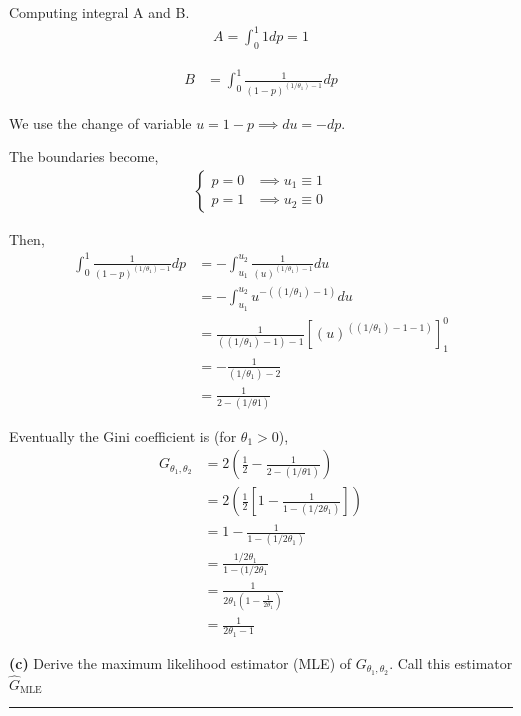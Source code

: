 Computing integral A and B.
\begin{align*}
  A = \int_0^1 1 dp = 1
\end{align*}

\begin{align*}
  B 
    &= \int_0^1 \frac{1}{(1-p)^{(1/\theta_1) - 1}} dp
\end{align*}

We use the change of variable $u = 1 - p \implies du = -dp$. 

The boundaries become, 
\begin{align*}
  \begin{cases}
    p = 0 &\implies u_1 \equiv 1 \\
    p = 1 &\implies u_2 \equiv 0
  \end{cases}
\end{align*}

Then, 
\begin{align*}
  \int_0^1 \frac{1}{(1-p)^{(1/\theta_1) - 1}} dp
    &= - \int_{u_1}^{u_2} \frac{1}{(u)^{(1/\theta_1) - 1}} du \\
    &= - \int_{u_1}^{u_2} u^{-((1/\theta_1) - 1)} du \\
    &= \frac{1}{((1/\theta_1) - 1) - 1} \left[ (u)^{((1/\theta_1) - 1 - 1)} \right]_1^0 \\
    &= -\frac{1}{(1/\theta_1) - 2} \\
    &= \frac{1}{2 - (1/\theta1)}
\end{align*}

Eventually the Gini coefficient is (for $\theta_1 > 0$),
\begin{align*}
  G_{\theta_1, \theta_2} 
    &= 2 \left( \frac{1}{2} - \frac{1}{2 - (1/\theta1)} \right) \\
    &= 2 \left( \frac{1}{2} \left[ 1 - \frac{1}{1 - (1/2\theta_1)} \right] \right) \\
    &= 1 - \frac{1}{1 - (1/2\theta_1)} \\
    &= \frac{1/2\theta_1}{1 - (1/2\theta_1} \\
    &= \frac{1}{2\theta_1 \left( 1 - \frac{1}{2\theta_1} \right)} \\
    &= \frac{1}{2\theta_1 - 1}
\end{align*}

\textbf{(c)} Derive the maximum likelihood estimator (MLE) of $G_{\theta_1, \theta_2}$. Call this estimator $\hat{G}_{\text{MLE}}$

\begin{center}\rule{6cm}{0.4pt}\end{center}

